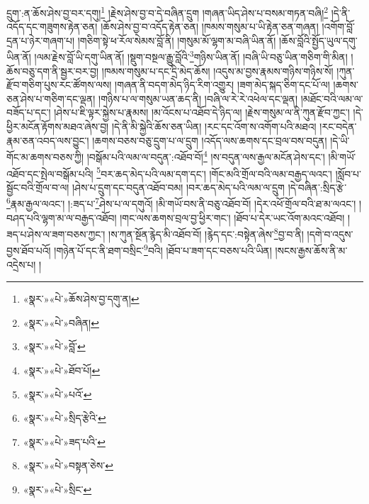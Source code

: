 དྲུག་:ན་ཆོས་ཤེས་བྱ་བར་དགུ།\footnote{«སྣར་»«པེ་»ཆོས་ཤེས་བྱ་དགུ་ན།} །རྗེས་ཤེས་བྱ་བ་དེ་བཞིན་དྲུག །གཞན་ཡིད་ཤེས་པ་བསམ་གཏན་བཞི།\footnote{«སྣར་»«པེ་»བཞིན།} །དེ་ནི་འདོད་དང་གཟུགས་རྟེན་ཅན། །ཆོས་ཤེས་བྱ་བ་འདོད་རྟེན་ཅན། །ཁམས་གསུམ་པ་ཡི་རྟེན་ཅན་གཞན། །འགོག་བློ་དྲན་པ་ཉེར་གཞག་པ། །གཅིག་སྟེ་ཕ་རོལ་སེམས་བློ་ནི། །གསུམ་མོ་ལྷག་མ་བཞི་ཡིན་ནོ། །ཆོས་བློའི་སྤྱོད་ཡུལ་དགུ་ཡིན་ནོ། །ལམ་རྗེས་བློ་ཡི་དགུ་ཡིན་ནོ། །སྡུག་བསྔལ་རྒྱུ་བློའི་\footnote{«སྣར་»«པེ་»བློ་}གཉིས་ཡིན་ནོ། །བཞི་ཡི་བཅུ་ཡིན་གཅིག་གི་མིན། །ཆོས་བཅུ་དག་ནི་སྦྱར་བར་བྱ། །ཁམས་གསུམ་པ་དང་དྲི་མེད་ཆོས། །འདུས་མ་བྱས་རྣམས་གཉིས་གཉིས་སོ། །ཀུན་རྫོབ་གཅིག་པུས་རང་ཚོགས་ལས། །གཞན་ནི་བདག་མེད་ཉིད་རིག་འགྱུར། །ཟག་མེད་སྐད་ཅིག་དང་པོ་ལ། །ཆགས་ཅན་ཤེས་པ་གཅིག་དང་ལྡན། །གཉིས་པ་ལ་གསུམ་ཡན་ཆད་ནི། །བཞི་ལ་རེ་རེ་འཕེལ་དང་ལྡན། །མཐོང་བའི་ལམ་ལ་བཟོད་པ་དང་། །ཤེས་པ་ཇི་ལྟར་སྐྱེས་པ་རྣམས། །མ་འོངས་པ་འཐོབ་དེ་ཉིད་ལ། །རྗེས་གསུམ་ལ་ནི་ཀུན་རྫོབ་ཀྱང་། །དེ་ཕྱིར་མངོན་རྟོགས་མཐའ་ཞེས་བྱ། །དེ་ནི་མི་སྐྱེའི་ཆོས་ཅན་ཡིན། །རང་དང་འོག་ས་འགོག་པའི་མཐའ། །རང་བདེན་རྣམ་ཅན་འབད་ལས་བྱུང་། །ཆགས་བཅས་བཅུ་དྲུག་པ་ལ་དྲུག །འདོད་ལས་ཆགས་དང་བྲལ་བས་བདུན། །དེ་ཡི་གོང་མ་ཆགས་བཅས་ཀྱི། །བསྒོམ་པའི་ལམ་ལ་བདུན་:འཐོབ་བོ།\footnote{«སྣར་»«པེ་»ཐོབ་པོ།} །ས་བདུན་ལས་རྒྱལ་མངོན་ཤེས་དང་། །མི་གཡོ་འཐོབ་དང་སྤེལ་བསྒོམ་པའི། \footnote{«སྣར་»«པེ་»པའོ་}བར་ཆད་མེད་པའི་ལམ་དག་དང་། །གོང་མའི་གྲོལ་བའི་ལམ་བརྒྱད་ལའང་། །སློབ་པ་སྦྱོང་བའི་གྲོལ་བ་ལ། །ཤེས་པ་དྲུག་དང་བདུན་འཐོབ་བམ། །བར་ཆད་མེད་པའི་ལམ་ལ་དྲུག །དེ་བཞིན་:སྲིད་རྩེ་\footnote{«སྣར་»«པེ་»སྲིད་རྩེའི་}རྣམ་རྒྱལ་ལའང་། །:ཟད་པ་\footnote{«སྣར་»«པེ་»ཟད་པའི་}ཤེས་པ་ལ་དགུའོ། །མི་གཡོ་བས་ནི་བཅུ་འཐོབ་བོ། །དེར་འཕོ་གྲོལ་བའི་ཐ་མ་ལའང་། །བཤད་པའི་ལྷག་མ་ལ་བརྒྱད་འཐོབ། །གང་ལས་ཆགས་བྲལ་བྱ་ཕྱིར་གང་། །ཐོབ་པ་དེར་ཡང་འོག་མའང་འཐོབ། །ཟད་པ་ཤེས་ལ་ཟག་བཅས་ཀྱང་། །ས་ཀུན་སྔོན་རྙེད་མི་འཐོབ་བོ། །རྙེད་དང་:བསྟེན་ཞེས་\footnote{«སྣར་»«པེ་»བསྟན་ཅེས་}བྱ་བ་ནི། །དགེ་བ་འདུས་བྱས་ཐོབ་པའོ། །གཉེན་པོ་དང་ནི་ཐག་བསྲིང་\footnote{«སྣར་»«པེ་»སྲིང་}བའི། །ཐོབ་པ་ཟག་དང་བཅས་པའི་ཡིན། །སངས་རྒྱས་ཆོས་ནི་མ་འདྲེས་པ། །

